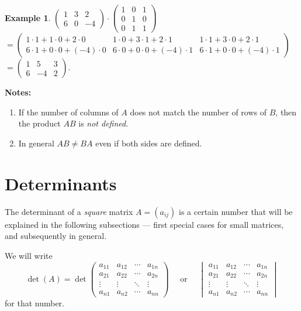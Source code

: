 \documentclass[
  12pt,
  oneside]{book}
\theoremstyle{definition}
\theoremstyle{definition}
\newtheorem{example}{Example}[chapter]
\theoremstyle{definition}
\theoremstyle{definition}
\theoremstyle{remark}
\begin{document}
\begin{example}
\protect\hypertarget{exm:unnamed-chunk-47}{}\label{exm:unnamed-chunk-47}\(\begin{pmatrix}1 & 3 & 2\\ 6 & 0 & -4\end{pmatrix}\cdot \begin{pmatrix}1 & 0 & 1\\ 0&1&0 \\ 0& 1 & 1\end{pmatrix}\)\\
\(=\begin{pmatrix}1\cdot1+1\cdot0+2\cdot0& 1\cdot0+3\cdot1+2\cdot1&1\cdot1+3\cdot0+2\cdot1\\ 6\cdot1+0\cdot0+(-4)\cdot0 & 6\cdot0+0\cdot0+(-4)\cdot1 & 6\cdot1+0\cdot0+(-4)\cdot1\end{pmatrix}\)\\
\(=\begin{pmatrix}1&5&3\\6&-4&2\end{pmatrix}\).
\end{example}

\textbf{Notes:}

\begin{enumerate}
\def\labelenumi{(\roman{enumi})}
\item
  If the number of columns of \(A\) does not match the number of rows of \(B\), then the product \(AB\) is \emph{not defined}.
\item
  In general \(AB\not=BA\) even if both sides are defined.
\end{enumerate}

\hypertarget{determinants}{%
\section{Determinants}\label{determinants}}

The determinant of a \emph{square} matrix \(A=(a_{ij})\) is a certain number that will be explained in the following subsections --- first special cases for small matrices, and subsequently in general.

We will write
\[
\det(A) = \det
\begin{pmatrix}
    a_{11} & a_{12} & \cdots & a_{1n}\\
    a_{21} & a_{22} & \cdots & a_{2n}\\
    \vdots & \vdots & \ddots & \vdots \\
    a_{n1} & a_{n2} & \cdots & a_{nn}
\end{pmatrix}
\quad\text{ or }\quad
\begin{vmatrix}
    a_{11} & a_{12} & \cdots & a_{1n}\\
    a_{21} & a_{22} & \cdots & a_{2n}\\
    \vdots & \vdots & \ddots & \vdots \\
    a_{n1} & a_{n2} & \cdots & a_{nn}
\end{vmatrix}
\]
for that number.
\end{document}
